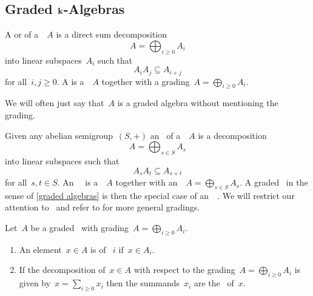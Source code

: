 \subsection{Graded \texorpdfstring{$\kf$}{k}-Algebras}


\begin{definition}
  \label{graded algebras}
  A  or  of a~\algebra{$\kf$}~$A$ is a direct sum decomposition
  \[
    A
    =
    \bigoplus_{i \geq 0} A_i
  \]
  into linear subspaces~$A_i$ such that
  \[
    A_i A_j
    \subseteq
    A_{i+j}
  \]
  for all~$i, j \geq 0$.
  A  is a~\algebra{$\kf$}~$A$ together with a grading~$A = \bigoplus_{i \geq 0} A_i$.
\end{definition}


\begin{remark}
  We will often just say that~$A$ is a graded algebra without mentioning the grading.
\end{remark}


\begin{remark}
  Given any abelian semigroup~$(S, +)$ an~ of a~\algebra{$\kf$}~$A$ is a decomposition
  \[
    A
    =
    \bigoplus_{s \in S} A_s
  \]
  into linear subspaces such that
  \[
    A_s A_t
    \subseteq
    A_{s + t}
  \]
  for all~$s,t \in S$.
  An~{}~\algebra{$\kf$} is a~\algebra{$\kf$}~$A$ together with an~~$A = \bigoplus_{s \in S} A_s$.
  A graded~\algebra{$\kf$} in the sense of \cref{graded algebras} is then the special case of an~{\graded{$\Natural$}}~\algebra{$\kf$}.
  We will restrict our attention to~{\gradings{$\Natural$}} and refer to \cite[II.{\S}11, III.{\S}3]{bourbaki_algebra} for more general gradings.
\end{remark}


\begin{definition}
  Let~$A$ be a graded~{\algebra{$\kf$}} with grading~$A = \bigoplus_{i \geq 0} A_i$.
  \begin{enumerate}
    \item
      An element~$x \in A$ is  of ~$i$ if~$x \in A_i$.
    \item
      If the decomposition of~$x \in A$ with respect to the grading~$A = \bigoplus_{i \geq 0} A_i$ is given by~$x = \sum_{i \geq 0} x_i$ then the summands~$x_i$ are the~ of~$x$.
  \end{enumerate}
\end{definition}


